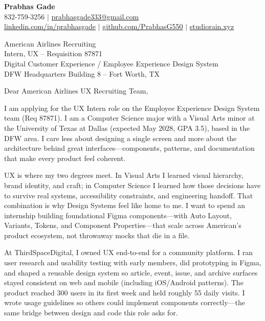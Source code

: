 \documentclass[letterpaper,11pt]{letter}
\begin{document}
\begin{flushleft}
\textbf{\large Prabhas Gade}\\
832-759-3256 $|$ \href{mailto:prabhasgade333@gmail.com}{prabhasgade333@gmail.com}\\
\href{https://linkedin.com/in/prabhasgade}{linkedin.com/in/prabhasgade} $|$
\href{https://github.com/PrabhasG550}{github.com/PrabhasG550} $|$
\href{https://studiorain.xyz}{studiorain.xyz}
\end{flushleft}

\vspace{6pt}
\begin{flushleft}
American Airlines Recruiting\\
Intern, UX -- Requisition 87871\\
Digital Customer Experience / Employee Experience Design System\\
DFW Headquarters Building 8 -- Fort Worth, TX
\end{flushleft}

Dear American Airlines UX Recruiting Team,

I am applying for the UX Intern role on the Employee Experience Design System team (Req 87871). I am a Computer Science major with a Visual Arts minor at the University of Texas at Dallas (expected May 2028, GPA 3.5), based in the DFW area. I care less about designing a single screen and more about the architecture behind great interfaces---components, patterns, and documentation that make every product feel coherent.

UX is where my two degrees meet. In Visual Arts I learned visual hierarchy, brand identity, and craft; in Computer Science I learned how those decisions have to survive real systems, accessibility constraints, and engineering handoff. That combination is why Design Systems feel like home to me. I want to spend an internship building foundational Figma components---with Auto Layout, Variants, Tokens, and Component Properties---that scale across American's product ecosystem, not throwaway mocks that die in a file.

At ThirdSpaceDigital, I owned UX end-to-end for a community platform. I ran user research and usability testing with early members, did prototyping in Figma, and shaped a reusable design system so article, event, issue, and archive surfaces stayed consistent on web and mobile (including iOS/Android patterns). The product reached 300 users in its first week and held roughly 55 daily visits. I wrote usage guidelines so others could implement components correctly---the same bridge between design and code this role asks for.
\end{document}
